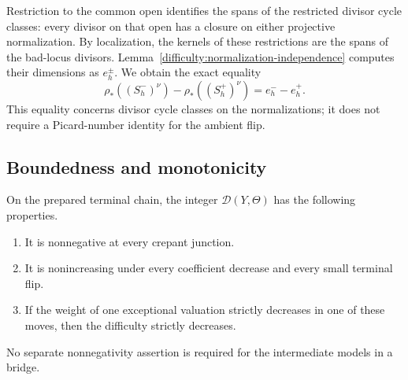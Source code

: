 Restriction to the common open identifies the spans of the
restricted divisor cycle classes: every divisor on that open has
a closure on either projective normalization.  By localization,
the kernels of these restrictions are the spans of the bad-locus
divisors.  Lemma~\ref{difficulty:normalization-independence} computes
their dimensions as \(e_h^\pm\).  We obtain the exact equality
\begin{equation}
\label{difficulty:rank-difference}
 \rho_*((S_h^-)^\nu)-\rho_*((S_h^+)^\nu)
   = e_h^- - e_h^+.
\end{equation}
This equality concerns divisor cycle classes on the normalizations;
it does not require a Picard-number identity for the ambient flip.

\subsection{Boundedness and monotonicity}

\begin{proposition}
\label{prop:difficulty}
On the prepared terminal chain, the integer
\(\mathcal D(Y,\Theta)\) has the following properties.
\begin{enumerate}[label=\textup{(\roman*)}]
\item It is nonnegative at every crepant junction.
\item It is nonincreasing under every coefficient decrease and
every small terminal flip.
\item If the weight of one exceptional valuation strictly decreases
in one of these moves, then the difficulty strictly decreases.
\end{enumerate}
No separate nonnegativity assertion is required for the intermediate
models in a bridge.
\end{proposition}

